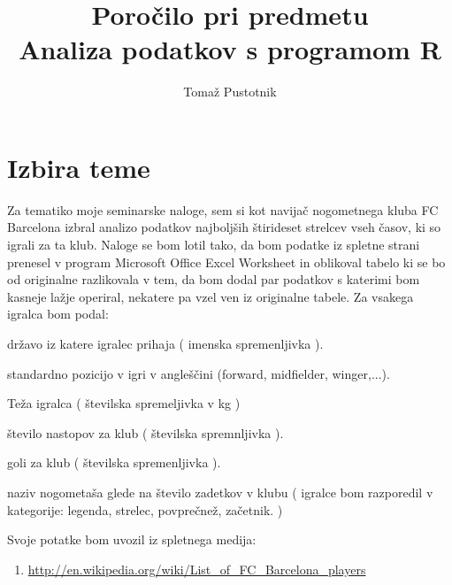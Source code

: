 \documentclass[11pt,a4paper]{article}
\begin{document}
\title{Poročilo pri predmetu \\
Analiza podatkov s programom R}
\author{Tomaž Pustotnik}
\maketitle

\section{Izbira teme}

Za tematiko moje seminarske naloge, sem si kot navijač nogometnega kluba FC Barcelona izbral analizo podatkov najboljših štirideset strelcev vseh časov, ki so igrali za ta klub. Naloge se bom lotil tako, da bom podatke iz spletne strani prenesel v program Microsoft Office Excel Worksheet in oblikoval tabelo ki se bo od originalne razlikovala v tem, da bom dodal par podatkov s katerimi bom kasneje lažje operiral, nekatere pa vzel ven iz originalne tabele. Za vsakega igralca bom podal:
\itemize
\item državo iz katere igralec prihaja ( imenska spremenljivka ).

\item standardno pozicijo v igri v angleščini (forward, midfielder, winger,...).

\item Teža igralca ( številska spremeljivka v kg )

\item število nastopov za klub ( številska spremnljivka ).

\item goli za klub ( številska spremenljivka ).

\item naziv nogometaša glede na število zadetkov v klubu ( igralce bom razporedil v kategorije: legenda, strelec, povprečnež, začetnik. )

Svoje potatke bom uvozil iz spletnega medija: 


\begin{enumerate}
\item{\url{http://en.wikipedia.org/wiki/List_of_FC_Barcelona_players
}}
\end{enumerate}
\end{document}
